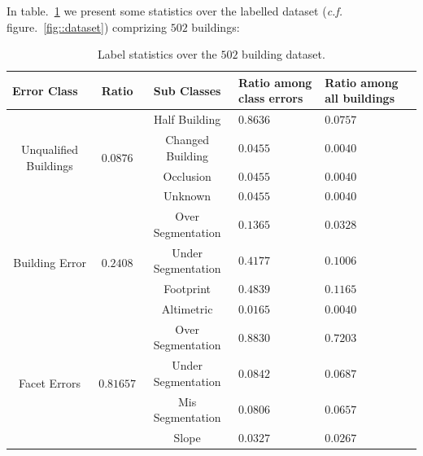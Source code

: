 \documentclass[a4paper, 11pt]{article}
\begin{document}
	In table.~\ref{tab::label_stats} we present some statistics over the labelled dataset (\textit{c.f.} figure.~\ref{fig::dataset}) comprizing $502$ buildings:

	\begin{table}[H]
		\centering
		\caption{\label{tab::label_stats} Label statistics over the $502$ building dataset.}
		\begin{tabular}{|c|c|c|p{2cm}|p{2cm}|}
			\hline
			\multicolumn{1}{|l|}{Error Class}      & Ratio             & Sub Classes & Ratio among class errors & Ratio among all buildings \\ \hline
			\multirow{4}{*}{Unqualified Buildings} & \multirow{4}{*}{$0.0876$} & Half Building & $0.8636$ & $0.0757$ \\ \cline{3-5}
				&                   & Changed Building & $0.0455$ & $0.0040$ \\ \cline{3-5}
				&                   & Occlusion & $0.0455$ & $0.0040$ \\ \cline{3-5}
				&                   & Unknown & $0.0455$ & $0.0040$ \\ \hline
			\hline
			\multirow{4}{*}{Building Error} & \multirow{4}{*}{$0.2408$} & Over Segmentation & $0.1365$ & $0.0328$\\ \cline{3-5}
				&                   & Under Segmentation & $0.4177$ & $0.1006$ \\ \cline{3-5}
				&                   & Footprint & $0.4839$ & $0.1165$ \\ \cline{3-5}
				&                   & Altimetric & $0.0165$ & $0.0040$ \\ \hline
      \hline
			\multirow{4}{*}{Facet Errors} & \multirow{4}{*}{$0.81657$} & Over Segmentation & $0.8830$ & $0.7203$ \\ \cline{3-5}
				&                   & Under Segmentation & $0.0842$ & $0.0687$ \\ \cline{3-5}
				&                   & Mis Segmentation & $0.0806$ & $0.0657$ \\ \cline{3-5}
				&                   & Slope & $0.0327$ & $0.0267$ \\ \hline
		\end{tabular}
	\end{table}
\end{document}

